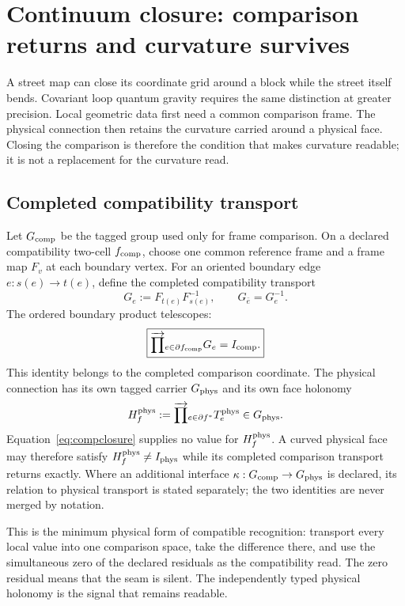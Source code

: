 \documentclass[10pt]{article}
\begin{document}
\section{Continuum closure: comparison returns and curvature survives}\label{sec:continuum}
A street map can close its coordinate grid around a block while the street
itself bends. Covariant loop quantum gravity requires the same distinction at
greater precision. Local geometric data first need a common comparison frame.
The physical connection then retains the curvature carried around a physical
face. Closing the comparison is therefore the condition that makes curvature
readable; it is not a replacement for the curvature read.

\subsection*{Completed compatibility transport}
Let $G_{\rm comp}$ be the tagged group used only for frame comparison. On a
declared compatibility two-cell $f_{\rm comp}$, choose one common reference
frame and a frame map $F_v$ at each boundary vertex. For an oriented boundary
edge $e:s(e)\to t(e)$, define the completed compatibility transport
\begin{equation}
G_e:=F_{t(e)}F_{s(e)}^{-1},\qquad G_{\bar e}=G_e^{-1}.
\end{equation}
The ordered boundary product telescopes:
\begin{equation}
\boxed{\overrightarrow{\prod}_{e\in\partial f_{\rm comp}}G_e=I_{\rm comp}.}
\label{eq:compclosure}
\end{equation}
This identity belongs to the completed comparison coordinate. The physical
connection has its own tagged carrier $G_{\rm phys}$ and its own face
holonomy
\begin{equation}
H_f^{\rm phys}:=\overrightarrow{\prod}_{e\in\partial f^*}T_e^{\rm phys}
\in G_{\rm phys}.
\label{eq:physhol}
\end{equation}
Equation~\eqref{eq:compclosure} supplies no value for
$H_f^{\rm phys}$. A curved physical face may therefore satisfy
$H_f^{\rm phys}\ne I_{\rm phys}$ while its completed comparison transport
returns exactly. Where an additional interface
$\kappa:G_{\rm comp}\to G_{\rm phys}$ is declared, its relation to physical
transport is stated separately; the two identities are never merged by
notation.

This is the minimum physical form of compatible recognition: transport every
local value into one comparison space, take the difference there, and use the
simultaneous zero of the declared residuals as the compatibility read. The
zero residual means that the seam is silent. The independently typed physical
holonomy is the signal that remains readable.
\end{document}
